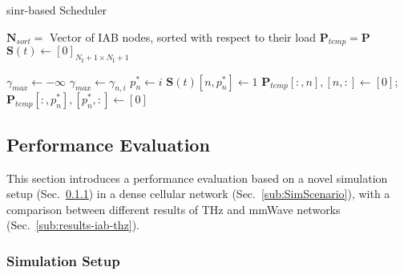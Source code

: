 \begin{algorithm}[t]
\small
	\caption{\gls{sinr}-based Scheduler} 
	\begin{algorithmic}
        \State $\bm{N}_{sort} =$ Vector of IAB nodes, sorted with respect to their load 
        \State $\bm{P}_{temp} =  \bm{P} $
        \State $\bm{S} (t) \gets [0]_{N_{\mathrm{I}} + 1 \times N_{\mathrm{I}} + 1} $
        
            \State $\gamma_{max} \gets - \infty$
                    \State $\gamma_{max} \gets \gamma_{n, i}$
                    \State $p_n^{*} \gets i$
                \EndIf
		    \EndFor
		\State $\bm{S} (t) [n, p_n^{*}] \gets 1$
        \State $\bm{P}_{temp} [:, n], [n, :] \gets [0] $; $\bm{P}_{temp} [:, p_n^{*}], [p_n^{*}, :] \gets [0] $
	\EndFor
	\end{algorithmic} 
\label{algo:sinr}
\end{algorithm}




\subsection{Performance Evaluation}
\label{sec:PerfEval}
This section introduces a performance evaluation based on a novel simulation setup (Sec.~\ref{sec:SimSetup}) in a dense cellular network (Sec.~\ref{sub:SimScenario}), with a comparison between different results of THz and mmWave networks (Sec.~\ref{sub:results-iab-thz}).

\subsubsection{Simulation Setup}
\label{sec:SimSetup}

